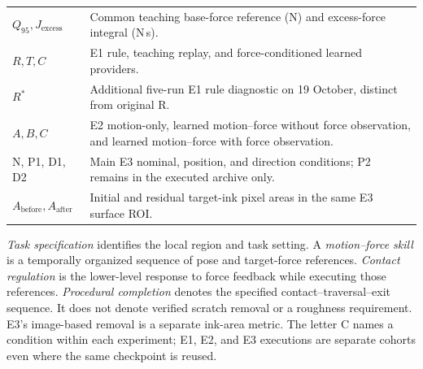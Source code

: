 \begin{longtable}{P{0.23\textwidth}p{0.69\textwidth}}
\(Q_{95},J_{\mathrm{excess}}\) & Common teaching base-force reference (N) and excess-force integral (N\,s). \\
\(R,T,C\) & E1 rule, teaching replay, and force-conditioned learned providers. \\
\(R^{*}\) & Additional five-run E1 rule diagnostic on 19 October, distinct from original R. \\
\(A,B,C\) & E2 motion-only, learned motion--force without force observation, and learned motion--force with force observation. \\
N, P1, D1, D2 & Main E3 nominal, position, and direction conditions; P2 remains in the executed archive only. \\
\(A_{\mathrm{before}},A_{\mathrm{after}}\) & Initial and residual target-ink pixel areas in the same E3 surface ROI. \\
\bottomrule
\end{longtable}

\emph{Task specification} identifies the local region and task setting. A \emph{motion--force skill} is a temporally organized sequence of pose and target-force references. \emph{Contact regulation} is the lower-level response to force feedback while executing those references. \emph{Procedural completion} denotes the specified contact--traversal--exit sequence. It does not denote verified scratch removal or a roughness requirement. E3's image-based removal is a separate ink-area metric. The letter C names a condition within each experiment; E1, E2, and E3 executions are separate cohorts even where the same checkpoint is reused.
